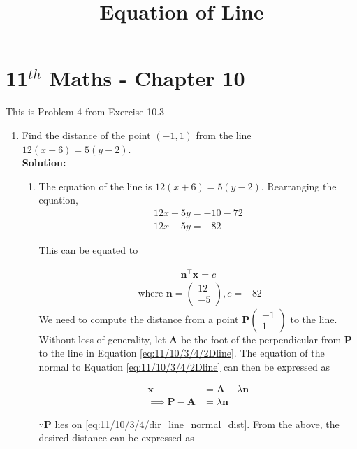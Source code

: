 \documentclass[12pt]{article}
\providecommand{\brak}[1]{\ensuremath{\left(#1\right)}}
\newcommand{\solution}{\noindent \textbf{Solution: }}
\newcommand{\myvec}[1]{\ensuremath{\begin{pmatrix}#1\end{pmatrix}}}
\let\vec\mathbf
\begin{document}
\begin{center}
\title{\textbf{Equation  of Line}}
\date{\vspace{-5ex}} %
\maketitle
\end{center}
\setcounter{page}{1}

\section{11$^{th}$ Maths - Chapter 10}
This is Problem-4 from Exercise 10.3
\begin{enumerate}
		\fi
\item Find the distance of the point $(-1,1)$ from the line $12\brak{x+6} = 5\brak{y-2}$. 
	\\
\solution 
\begin{enumerate}
\item The equation of the line is $12\brak{x+6} = 5\brak{y-2}$. Rearranging the equation, 
\begin{align}
12x-5y = -10-72 \\
12x-5y = -82
\end{align}

This can be equated to

\begin{align}
	\label{eq:11/10/3/4/2Dline}
	\vec{n}^\top\vec{x} = c 
\end{align}
\begin{align}
	\text{ where }
		\vec{n} = \myvec{
	  12 \\
	  -5 
	  } ,   c = -82 
\end{align}
		We need to compute the distance from a point $\vec{P}\myvec{-1 \\ 1}$ to the line. 
Without loss of generality, let $\vec{A}$ be the foot of the perpendicular from $\vec{P}$ to the line in Equation \eqref{eq:11/10/3/4/2Dline}. 
The equation of the normal to Equation \eqref{eq:11/10/3/4/2Dline} can then be expressed as 

\begin{align}
	\label{eq:11/10/3/4/dir_line_normal_dist}
	\vec{x} &= \vec{A} + \lambda \vec{n}
	\\
	\implies 
	\label{eq:11/10/3/4/dir_line_normal_dist_pa}
	\vec{P}- \vec{A} &=  \lambda \vec{n}
\end{align}

$\because \vec{P}$ lies on 
		\eqref{eq:11/10/3/4/dir_line_normal_dist}.
From the above, the desired distance can be expressed as 


\end{enumerate}
\end{enumerate}
\end{document}
